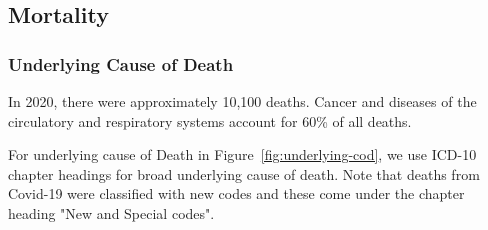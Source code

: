 



\subsection{Mortality}
\subsubsection{Underlying Cause of Death} In 2020, there were approximately 10,100 deaths. Cancer and diseases of the circulatory and respiratory systems account for 60\% of all deaths.

For underlying cause of Death in Figure~\ref{fig:underlying-cod}, we use ICD-10 chapter headings for broad underlying cause of death. Note that deaths from Covid-19 were classified with new codes and these come under the chapter heading "New and Special codes".

